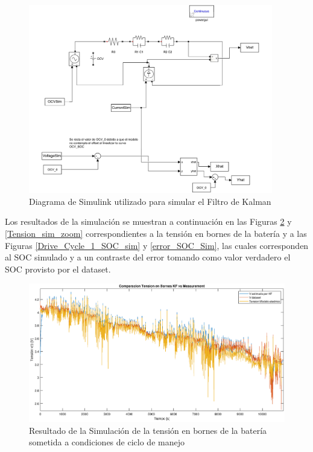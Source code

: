 \documentclass[10pt,a4paper]{article}
\begin{document}
	\begin{figure}[h!]
		\begin{center}
			\includegraphics[width=0.95\textwidth]{simulink.pdf}
			\caption{Diagrama de Simulink utilizado para simular el Filtro de Kalman}
			\label{simulink_diagram}
		\end{center}
	\end{figure}
	
	Los resultados de la simulación se muestran a continuación en las Figuras \ref{Tension_sim} y \ref{Tension_sim_zoom} correspondientes a la tensión en bornes de la batería y  a las Figuras \ref{Drive_Cycle_1_SOC_sim} y \ref{error_SOC_Sim}, las cuales corresponden al SOC simulado y a un contraste del error tomando como valor verdadero el SOC provisto por el dataset.
	
	\begin{figure}[h!]
		\begin{center}
			\includegraphics[width=1\textwidth]{Tension_Sim.eps}
			\caption{Resultado de la Simulación de la tensión en bornes de la 
                     batería sometida a condiciones de ciclo de manejo}
			\label{Tension_sim}
		\end{center}
	\end{figure}
	
\end{document}
